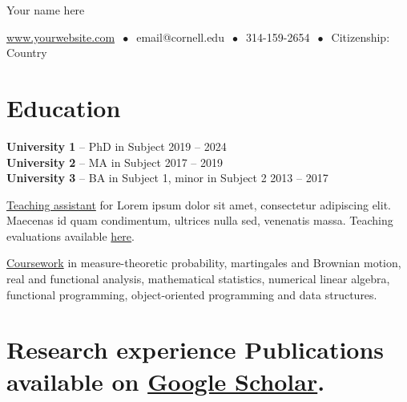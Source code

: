 \documentclass[letterpaper, 12pt]{article}
\begin{document}

{\huge Your name here}

\href{https://en.wikibooks.org/wiki/LaTeX/Hyperlinks}{www.yourwebsite.com} {\footnotesize$~\bullet~$} email@cornell.edu {\footnotesize$~\bullet~$} 314-159-2654 {\footnotesize$~\bullet~$} Citizenship: Country


\section*{Education}

\begin{addmargin}[1em]{0em}

\textbf{University 1} -- PhD in Subject \hfill 2019 -- 2024 \\
\textbf{University 2} -- MA in Subject \hfill 2017 -- 2019 \\
\textbf{University 3} -- BA in Subject 1, minor in Subject 2 \hfill 2013 -- 2017

\begin{singlespace}

{\footnotesize \ul{Teaching assistant} for Lorem ipsum dolor sit amet, consectetur adipiscing elit. Maecenas id quam condimentum, ultrices nulla sed, venenatis massa. Teaching evaluations available \href{https://en.wikibooks.org/wiki/LaTeX/Hyperlinks}{here}.}

{\footnotesize \ul{Coursework} in measure-theoretic probability, martingales and Brownian motion, real and functional analysis, mathematical statistics, numerical linear algebra, functional programming, object-oriented programming and data structures.}

\end{singlespace}

\end{addmargin}


\section*{Research experience \hfill {\normalfont\footnotesize Publications available on \href{https://scholar.google.com/}{Google Scholar}.}}
\end{document}
